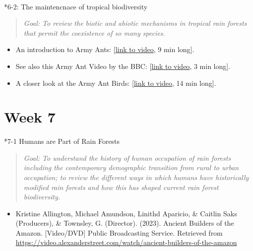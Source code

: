 \documentclass[
  10pt,
  letterpaper,
  oneside,
  open=any]{scrbook}
\makeatletter
\let\oldparagraph\paragraph
\renewcommand{\paragraph}{
    \@ifstar
      \xxxParagraphStar
      \xxxParagraphNoStar
  }
\newcommand{\xxxParagraphStar}[1]{\oldparagraph*{#1}\mbox{}}
\newcommand{\xxxParagraphNoStar}[1]{\oldparagraph{#1}\mbox{}}
\providecommand{\tightlist}{%
  \setlength{\itemsep}{0pt}\setlength{\parskip}{0pt}}
\makeatother
\begin{document}
\paragraph*{6-2: The maintencnace of tropical
biodiversity}\label{the-maintencnace-of-tropical-biodiversity}

\begin{quote}
\emph{Goal: To review the biotic and abiotic mechanisms in tropical rain
forests that permit the coexistence of so many species.}
\end{quote}

\begin{itemize}
\item
  An introduction to Army Ants:
  {[}\href{https://www.youtube.com/watch?v=p16g5IVCdeE}{link to video},
  9 min long{]}.
\item
  See also this Army Ant Video by the BBC:
  {[}\href{https://www.youtube.com/watch?v=JsfiUR0ZzLw}{link to video},
  3 min long{]}.
\item
  A closer look at the Army Ant Birds:
  {[}\href{https://www.youtube.com/watch?v=SQPcIYV_vKM}{link to video},
  14 min long{]}.
\end{itemize}

\section*{Week 7}\label{week-7}


\paragraph*{7-1 Humans are Part of Rain
Forests}\label{humans-are-part-of-rain-forests}

\begin{quote}
\emph{Goal: To understand the history of human occupation of rain
forests including the contemporary demographic transition from rural to
urban occupation; to review the different ways in which humans have
historically modified rain forests and how this has shaped current rain
forest biodiversity.}
\end{quote}

\begin{itemize}
\tightlist
\item
  Kristine Allington, Michael Amundson, Linithd Aparicio, \& Caitlin
  Saks (Producers), \& Townsley, G. (Director). (2023). Ancient Builders
  of the Amazon. {[}Video/DVD{]} Public Broadcasting Service. Retrieved
  from
  \url{https://video.alexanderstreet.com/watch/ancient-builders-of-the-amazon}
\end{itemize}
\end{document}
